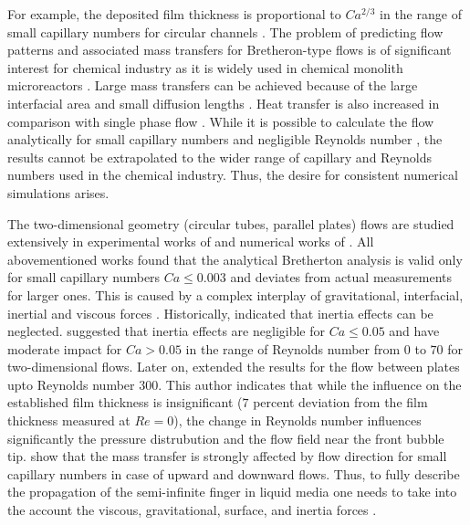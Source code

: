 \documentclass{article}
\begin{document}
For example, the deposited film thickness
is proportional to $Ca^{2/3}$ in the range of small capillary numbers for circular channels
\cite{bretherton,heil-bretherton}. 
The problem of predicting flow patterns and associated mass transfers for Bretheron-type flows
is of significant interest for chemical industry as it is widely used in chemical monolith
microreactors \cite{kreutzer-pressure-drop}. Large mass transfers can be achieved because of the
large interfacial area and small diffusion lengths \cite{cerro-bubble-train}. Heat transfer is
also increased in comparison with single phase flow \cite{fukugata-levelset}. While it
is possible to calculate the flow analytically for small capillary numbers and negligible Reynolds
number \cite{bretherton}, the
results cannot be extrapolated to the wider range of capillary and Reynolds numbers used in the
chemical industry.  Thus, the desire for consistent numerical simulations arises.

The two-dimensional geometry (circular tubes, parallel plates) flows are studied extensively in
experimental works of \citet{aussillous-deposition, cerro-bubble-train} and numerical works of
\citet{giavedoni-numerical,heil-bretherton}. All abovementioned works found that the analytical
Bretherton
analysis is valid only for small capillary numbers $Ca\leq 0.003$ and deviates from actual
measurements for larger ones.
This is caused by a complex interplay of gravitational,
interfacial, inertial and viscous forces \cite{gupta-review}. Historically, 
\citet{bretherton} indicated that inertia effects can be 
neglected. \citet{giavedoni-numerical} suggested
that
inertia effects
are negligible for $Ca \leq 0.05$ and have moderate impact for $Ca>0.05$ in the range of Reynolds
number from $0$ to $70$ for two-dimensional flows. Later on, \citet{heil-bretherton}
extended
the results for the flow between plates upto Reynolds number
$300$. This author indicates that while the influence on the established film thickness is
insignificant
($7$ percent deviation from the film thickness measured at $Re=0$), the change in Reynolds number 
influences significantly the pressure distrubution and the flow field near the front bubble tip.
\citet{cerro-bubble-train} show that the mass transfer is strongly affected by flow direction for
small capillary numbers in case of upward and downward flows. Thus, to fully describe the
propagation of the semi-infinite finger in liquid media one needs to take into the account the
viscous, gravitational, surface, and inertia forces \cite{gupta-review}.  
\end{document}
